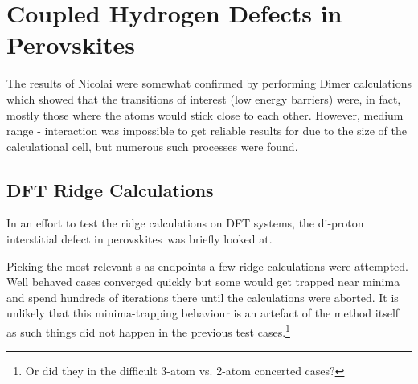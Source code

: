\chapter{Coupled Hydrogen Defects in Perovskites}
\label{chap:perovskites}


The results of Nicolai were somewhat confirmed by performing Dimer calculations which showed that the transitions of interest (low energy barriers) were, in fact, mostly those where the  atoms would stick close to each other.
However, medium range - interaction was impossible to get reliable results for due to the size of the calculational cell, but numerous such processes were found.

\section{DFT Ridge Calculations}
In an effort to test the ridge calculations on DFT systems, the di-proton interstitial defect in  perovskites~\citemiss was briefly looked at.

Picking the most relevant s as endpoints a few ridge calculations were attempted.
Well behaved cases converged quickly but some would get trapped near minima and spend hundreds of iterations there until the calculations were aborted.
It is unlikely that this minima-trapping behaviour is an artefact of the method itself as such things did not happen in the previous test cases.\footnote{Or did they in the difficult 3-atom vs. 2-atom concerted cases?}


